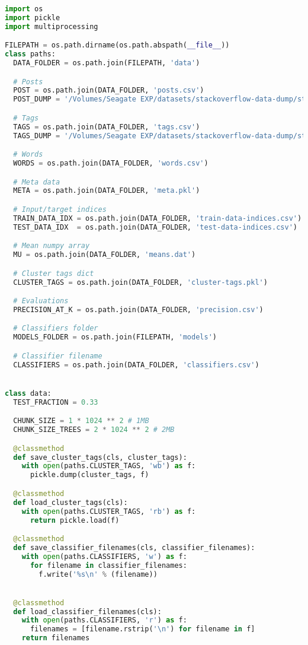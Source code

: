 \begin{lstlisting}[language=python]
import os
import pickle
import multiprocessing

FILEPATH = os.path.dirname(os.path.abspath(__file__))
class paths:
  DATA_FOLDER = os.path.join(FILEPATH, 'data')

  # Posts
  POST = os.path.join(DATA_FOLDER, 'posts.csv')
  POST_DUMP = '/Volumes/Seagate EXP/datasets/stackoverflow-data-dump/stackoverflow/stackoverflow.com-Posts'

  # Tags
  TAGS = os.path.join(DATA_FOLDER, 'tags.csv')
  TAGS_DUMP = '/Volumes/Seagate EXP/datasets/stackoverflow-data-dump/stackoverflow/stackoverflow.com-Tags'

  # Words
  WORDS = os.path.join(DATA_FOLDER, 'words.csv')

  # Meta data
  META = os.path.join(DATA_FOLDER, 'meta.pkl')

  # Input/target indices
  TRAIN_DATA_IDX = os.path.join(DATA_FOLDER, 'train-data-indices.csv')
  TEST_DATA_IDX  = os.path.join(DATA_FOLDER, 'test-data-indices.csv')

  # Mean numpy array
  MU = os.path.join(DATA_FOLDER, 'means.dat')

  # Cluster tags dict
  CLUSTER_TAGS = os.path.join(DATA_FOLDER, 'cluster-tags.pkl')

  # Evaluations
  PRECISION_AT_K = os.path.join(DATA_FOLDER, 'precision.csv')

  # Classifiers folder
  MODELS_FOLDER = os.path.join(FILEPATH, 'models')

  # Classifier filename
  CLASSIFIERS = os.path.join(DATA_FOLDER, 'classifiers.csv')


class data:
  TEST_FRACTION = 0.33

  CHUNK_SIZE = 1 * 1024 ** 2 # 1MB
  CHUNK_SIZE_TREES = 2 * 1024 ** 2 # 2MB

  @classmethod
  def save_cluster_tags(cls, cluster_tags):
    with open(paths.CLUSTER_TAGS, 'wb') as f:
      pickle.dump(cluster_tags, f)

  @classmethod
  def load_cluster_tags(cls):
    with open(paths.CLUSTER_TAGS, 'rb') as f:
      return pickle.load(f)

  @classmethod
  def save_classifier_filenames(cls, classifier_filenames):
    with open(paths.CLASSIFIERS, 'w') as f:
      for filename in classifier_filenames:
        f.write('%s\n' % (filename))


  @classmethod
  def load_classifier_filenames(cls):
    with open(paths.CLASSIFIERS, 'r') as f:
      filenames = [filename.rstrip('\n') for filename in f]
    return filenames



\end{lstlisting}
